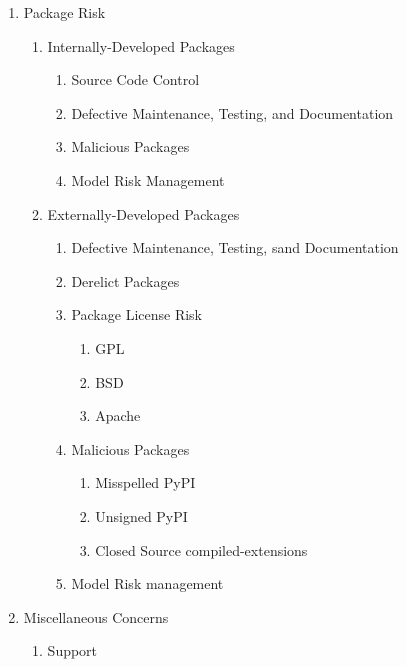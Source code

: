 \begin{enumerate}
        \item Package Risk
        \begin{enumerate}
                \item Internally-Developed Packages
                \begin{enumerate}
                        \item Source Code Control
                        \item Defective Maintenance, Testing, and Documentation
                        \item Malicious Packages
                        \item Model Risk Management
                \end{enumerate}
                \item Externally-Developed Packages
                \begin{enumerate}
                        \item Defective Maintenance, Testing, sand Documentation
                        \item Derelict Packages
                        \item Package License Risk
                        \begin{enumerate}
                                \item GPL
                                \item BSD
                                \item Apache
                        \end{enumerate}
                        \item Malicious Packages
                        \begin{enumerate}
                                \item Misspelled PyPI
                                \item Unsigned PyPI
                                \item Closed Source compiled-extensions
                        \end{enumerate}
                        \item Model Risk management
                \end{enumerate}
        \end{enumerate} %

        \item Miscellaneous Concerns
        \begin{enumerate}
                \item Support
        \end{enumerate} %

\end{enumerate} %